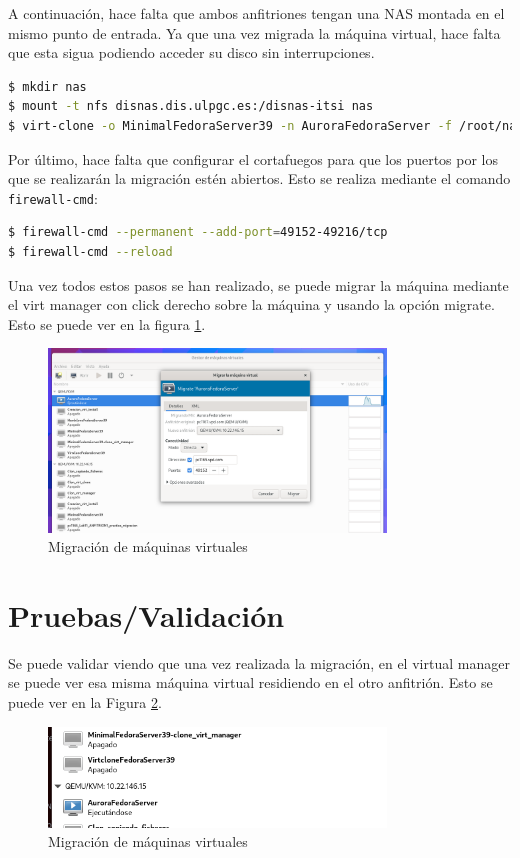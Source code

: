 \documentclass[spanish]{article}
\begin{document}
A continuación, hace falta que ambos anfitriones tengan una NAS montada en el mismo punto de entrada.
Ya que una vez migrada la máquina virtual, hace falta que esta sigua podiendo acceder su disco sin interrupciones.

\begin{lstlisting}[language=bash,breaklines=true]
$ mkdir nas
$ mount -t nfs disnas.dis.ulpgc.es:/disnas-itsi nas
$ virt-clone -o MinimalFedoraServer39 -n AuroraFedoraServer -f /root/nas/pc1167_Lab11_ANFITRION1_practica_migracion.qcow2
\end{lstlisting}

Por último, hace falta que configurar el cortafuegos para que
los puertos por los que se realizarán la migración estén abiertos.
Esto se realiza mediante el comando \texttt{firewall-cmd}:

\begin{lstlisting}[language=bash,breaklines=true]
$ firewall-cmd --permanent --add-port=49152-49216/tcp
$ firewall-cmd --reload
\end{lstlisting}

Una vez todos estos pasos se han realizado, se puede migrar la máquina mediante el virt manager con click derecho sobre la máquina
y usando la opción migrate. Esto se puede ver en la figura \ref{fig:migration}.

\begin{figure}[h]
\centering
\includegraphics[width=0.8\textwidth]{migration}
\caption{Migración de máquinas virtuales}
\label{fig:migration}
\end{figure}

\section{Pruebas/Validación}

Se puede validar viendo que una vez realizada la migración,
en el virtual manager se puede ver esa misma máquina virtual residiendo en el otro anfitrión.
Esto se puede ver en la Figura \ref{fig:verify}.

\begin{figure}[h]
\centering
\includegraphics[width=0.8\textwidth]{verification}
\caption{Migración de máquinas virtuales}
\label{fig:verify}
\end{figure}
\end{document}
